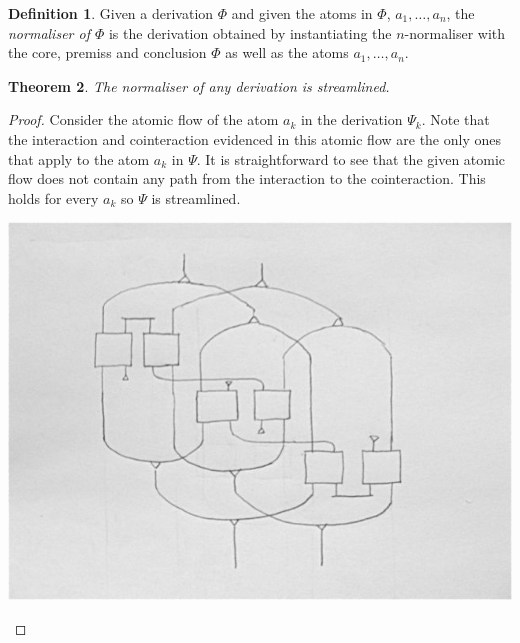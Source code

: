 \documentclass[a4paper]{amsart}
\newtheorem{thm}{Theorem}[section]
\theoremstyle{remark}
\theoremstyle{definition}
\newtheorem{defi}[thm]{Definition}
\begin{document}
\begin{defi}
Given a derivation $\Phi$ and given the atoms in $\Phi$, $a_1,\dots,a_n$, the \emph{normaliser of $\Phi$} is the derivation obtained by instantiating the $n$-normaliser with the core, premiss and conclusion $\Phi$ as well as the atoms $a_1,\dots,a_n$.
\end{defi}

\begin{thm}
The normaliser of any derivation is streamlined.
\end{thm}
\begin{proof}

Consider the atomic flow of the atom $a_k$ in the derivation $\Psi_k$. Note that the interaction and cointeraction evidenced in this atomic flow are the only ones that apply to the atom $a_k$ in $\Psi$. It is straightforward to see that the given atomic flow does not contain any path from the interaction to the cointeraction. This holds for every $a_k$ so $\Psi$ is streamlined.

\begin{center}
\includegraphics[scale=0.5]{./threeboxes.png}
\end{center}

\end{proof}



%
% 
% 
\end{document}
